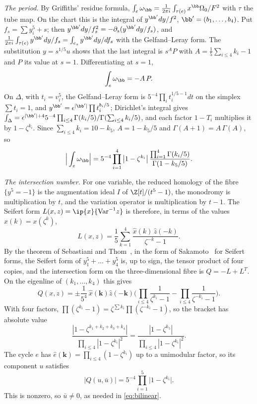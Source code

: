 \emph{The period.} By Griffiths' residue formula,
$\int_e\omega_{\bb}=\frac1{2\pi i}\int_{\tau(e)}x^{\bb}\Omega_0/F^2$ with
$\tau$ the tube map. On the chart this is the integral of
$y^{\bb'}dy/f^2$, $\bb'=(b_1,\dots,b_4)$. Put $f_s=\sum y_i^5+s$; then
$y^{\bb'}dy/f_s^2=-\partial_s(y^{\bb'}dy/f_s)$, and
$\frac1{2\pi i}\int_{\tau(e)}y^{\bb'}dy/f_s=\int_{e_s}y^{\bb'}dy/df_s$
with the Gelfand--Leray form. The substitution $y=s^{1/5}u$ shows that the
last integral is $s^{A}P$ with $A=\frac15\sum_{i\le4}k_i-1$ and $P$ its value
at $s=1$. Differentiating at $s=1$,
\[
\int_e\omega_{\bb}=-A\,P.
\]
On $\Delta$, with $t_i=v_i^5$, the Gelfand--Leray form is
$5^{-4}\prod_it_i^{1/5-1}dt$ on the simplex $\sum t_i=1$, and
$y^{\bb'}=\epsilon^{|\bb'|}\prod t_i^{b_i/5}$; Dirichlet's integral gives
$\int_\Delta=\epsilon^{|\bb'|+4}5^{-4}\prod_{i\le4}\Gamma(k_i/5)/
\Gamma(\sum_{i\le4}k_i/5)$, and each factor $1-T_i$ multiplies it by
$1-\zeta^{k_i}$. Since $\sum_{i\le4}k_i=10-k_5$, $A=1-k_5/5$ and
$\Gamma(A+1)=A\,\Gamma(A)$, so
\begin{equation}\label{eq:period}
\Big|\int_e\omega_{\bb}\Big|=5^{-4}\prod_{i=1}^4\big|1-\zeta^{k_i}\big|
\,\frac{\prod_{i=1}^4\Gamma(k_i/5)}{\Gamma(1-k_5/5)}.
\end{equation}

\emph{The intersection number.} For one variable, the reduced homology of
the fibre $\{y^5=-1\}$ is the augmentation ideal $I$ of $\Z[t]/(t^5-1)$,
the monodromy is multiplication by $t$, and the variation operator is
multiplication by $t-1$. The Seifert form $L(x,z)=\ip{x}{\mathrm{Var}^{-1}z}$
is therefore, in terms of the values $\hat x(k)=x(\zeta^k)$,
\[
L(x,z)=\frac15\sum_{k=1}^4\frac{\hat x(k)\,\hat z(-k)}{\zeta^{-k}-1}.
\]
By the theorem of Sebastiani and Thom~\cite{ST71}, in the form of
Sakamoto~\cite{Sak74} for Seifert forms, the Seifert form of
$y_1^5+\dots+y_4^5$ is, up to sign, the tensor product of four copies, and
the intersection form on the three-dimensional fibre is $Q=-L+L^{T}$. On the
eigenline of $(k_1,\dots,k_4)$ this gives
\[
Q(x,z)=\pm\frac1{5^4}\,\hat x(\mathbf k)\hat z(-\mathbf k)\Big(
\prod_{i\le4}\frac1{\zeta^{k_i}-1}-\prod_{i\le4}\frac1{\zeta^{-k_i}-1}\Big).
\]
With four factors, $\prod(\zeta^{k_i}-1)=\zeta^{\sum k_i}\prod(\zeta^{-k_i}
-1)$, so the bracket has absolute value
\[
\frac{|1-\zeta^{k_1+k_2+k_3+k_4}|}{\prod_{i\le4}|1-\zeta^{k_i}|^2}
=\frac{|1-\zeta^{k_5}|}{\prod_{i\le4}|1-\zeta^{k_i}|^2}.
\] The cycle $e$ has
$\hat e(\mathbf k)=\prod_{i\le4}(1-\zeta^{k_i})$ up to a unimodular factor,
so its component $u$ satisfies
\begin{equation}\label{eq:intersection}
|Q(u,\bar u)|=5^{-4}\prod_{i=1}^5\big|1-\zeta^{k_i}\big|.
\end{equation}
This is nonzero, so $\bar u\ne0$, as needed in \eqref{eq:bilinear}.

